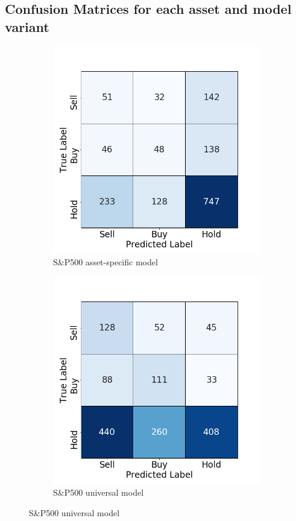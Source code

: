\documentclass[11pt, a4paper]{article}
\begin{document}
\subsection{Confusion Matrices for each asset and model variant}
\label{subsec:App:CMs}

\begin{figure}[H]

\begin{subfigure}{.5\textwidth}
  \centering
  \includegraphics[width=.75\linewidth]{images/CMs/CM_indiv_GSPC.png}  
  \caption{S\&P500 asset-specific model}
  \label{fig:subGSPCI}
\end{subfigure}
\begin{subfigure}{.5\textwidth}
  \centering
  \includegraphics[width=.75\linewidth]{images/CMs/CM_univ_GSPC.png}  
  \caption{S\&P500 universal model}
  \label{fig:subGSPCU}
\end{subfigure}


\end{figure}
\end{document}
